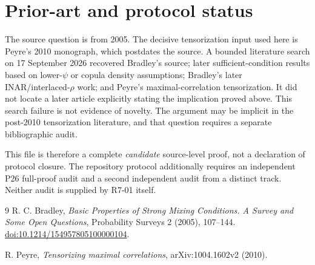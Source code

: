 \documentclass[11pt]{article}
\begin{document}
\section{Prior-art and protocol status}

The source question is from 2005.  The decisive tensorization input used here is Peyre's 2010 monograph, which postdates the source.  A bounded literature search on 17 September 2026 recovered Bradley's source; later sufficient-condition results based on lower-$\psi$ or copula density assumptions; Bradley's later INAR/interlaced-$\rho$ work; and Peyre's maximal-correlation tensorization.  It did not locate a later article explicitly stating the implication proved above.  This search failure is not evidence of novelty.  The argument may be implicit in the post-2010 tensorization literature, and that question requires a separate bibliographic audit.

This file is therefore a complete \emph{candidate} source-level proof, not a declaration of protocol closure.  The repository protocol additionally requires an independent P26 full-proof audit and a second independent audit from a distinct track.  Neither audit is supplied by R7-01 itself.

\begin{thebibliography}{9}
R. C. Bradley,
\emph{Basic Properties of Strong Mixing Conditions. A Survey and Some Open Questions},
Probability Surveys 2 (2005), 107--144.
\href{https://doi.org/10.1214/154957805100000104}{doi:10.1214/154957805100000104}.

R. Peyre,
\emph{Tensorizing maximal correlations},
arXiv:1004.1602v2 (2010).
\end{thebibliography}
\end{document}
